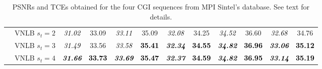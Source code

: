 \documentclass[10pt, journal, twocolumn, final, a4paper]{IEEEtran}
\newcommand{\bsic}[1]{\textcolor{black}{\textit{#1}}}
\newcommand{\Bsic}[1]{\textcolor{black}{\textbf{\textit{#1}}}}
\newcommand{\Best}[1]{\textbf{\textcolor{black}{#1}}}
\begin{document}
\begin{table}[htp!]
\begin{center}
{\begin{tabular}{ c | l |c c | c c | c c | c c | c c}
			                      & VNLB   $s_t = 2$     & \bsic{31.02} &       33.09  & \bsic{33.11} &       35.09  & \bsic{32.08} &       34.25  & \bsic{34.52} &       36.60  & \bsic{32.68} &       34.76  \\
										 & VNLB   $s_t = 3$     & \bsic{31.49} &       33.56  & \bsic{33.58} & \Best{35.41} & \Bsic{32.34} & \Best{34.55} & \Bsic{34.82} & \Best{36.96} & \Bsic{33.06} & \Best{35.12} \\
			                      & VNLB   $s_t = 4$     & \Bsic{31.66} & \Best{33.73} & \Bsic{33.69} & \Best{35.47} & \Bsic{32.37} & \Best{34.59} & \Bsic{34.82} & \Best{36.95} & \Bsic{33.14} & \Best{35.19} \\\hline
		\end{tabular}}
	\end{center}
	\caption{PSNRs and TCEs obtained for the four CGI sequences from MPI
	Sintel's database. See text for details.}
	\label{tab:sintel}
\end{table}
\end{document}
